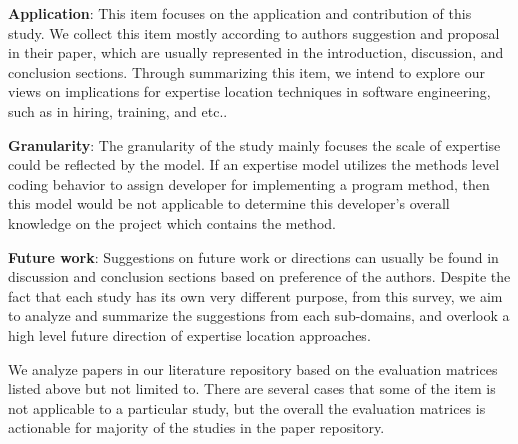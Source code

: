 \textbf{Application}: This item focuses on the application and contribution of this study. We collect this item mostly according to authors suggestion and proposal in their paper, which are usually represented in the introduction, discussion, and conclusion sections. Through summarizing this item, we intend to explore our views on implications for expertise location techniques in software engineering, such as in hiring, training, and etc..

\textbf{Granularity}: The granularity of the study mainly focuses the scale of expertise could be reflected by the model. If an expertise model utilizes the methods level coding behavior to assign developer for implementing a program method, then this model would be not applicable to determine this developer's overall knowledge on the project which contains the method. 

\textbf{Future work}: Suggestions on future work or directions can usually be found in discussion and conclusion sections based on preference of the authors. Despite the fact that each study has its own very different purpose, from this survey, we aim to analyze and summarize the suggestions from each sub-domains, and overlook a high level future direction of expertise location approaches. 

We analyze papers in our literature repository based on the evaluation matrices listed above but not limited to. There are several cases that some of the item is not applicable to a particular study, but the overall the evaluation matrices is actionable for majority of the studies in the paper repository.